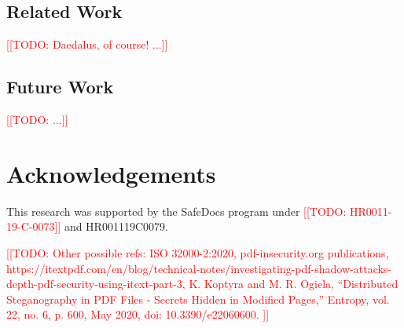\documentclass[conference,12pt]{IEEEtran}
\newcommand{\note}[1]{\noteYes{#1}}
\newcommand{\noteYes}[1]{\textcolor{red}{[[#1]]}}
\newcommand{\todo}[1]{\note{TODO: #1}}
\begin{document}
\subsection{Related Work}
\todo{Daedalus, of course! ...}
      
\subsection{Future Work}
\todo{...}


\section*{Acknowledgements}

This research was supported by the SafeDocs program under \todo{HR0011-19-C-0073} and HR001119C0079.




% 
\todo{Other possible refs: ISO 32000-2:2020, pdf-insecurity.org publications, https://itextpdf.com/en/blog/technical-notes/investigating-pdf-shadow-attacks-depth-pdf-security-using-itext-part-3, K. Koptyra and M. R. Ogiela, “Distributed Steganography in PDF Files - Secrets Hidden in Modified Pages,” Entropy, vol. 22, no. 6, p. 600, May 2020, doi: 10.3390/e22060600.
}
\end{document}
